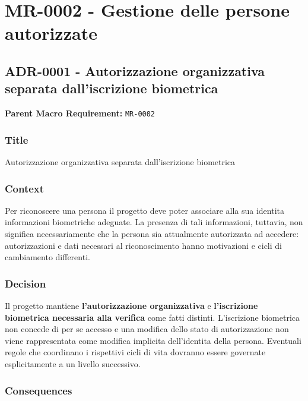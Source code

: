\documentclass[
  10pt,
]{article}
\begin{document}
\section{MR-0002 - Gestione delle persone
autorizzate}\label{mr-0002---gestione-delle-persone-autorizzate}

\subsection{ADR-0001 - Autorizzazione organizzativa separata
dall'iscrizione
biometrica}\label{adr-0001---autorizzazione-organizzativa-separata-dalliscrizione-biometrica}

\textbf{Parent Macro Requirement:} \texttt{MR-0002}

\subsubsection{Title}\label{title-2}

Autorizzazione organizzativa separata dall'iscrizione biometrica

\subsubsection{Context}\label{context-2}

Per riconoscere una persona il progetto deve poter associare alla sua
identita informazioni biometriche adeguate. La presenza di tali
informazioni, tuttavia, non significa necessariamente che la persona sia
attualmente autorizzata ad accedere: autorizzazioni e dati necessari al
riconoscimento hanno motivazioni e cicli di cambiamento differenti.

\subsubsection{Decision}\label{decision-2}

Il progetto mantiene \textbf{l'autorizzazione organizzativa} e
\textbf{l'iscrizione biometrica necessaria alla verifica} come fatti
distinti. L'iscrizione biometrica non concede di per se accesso e una
modifica dello stato di autorizzazione non viene rappresentata come
modifica implicita dell'identita della persona. Eventuali regole che
coordinano i rispettivi cicli di vita dovranno essere governate
esplicitamente a un livello successivo.

\subsubsection{Consequences}\label{consequences-2}
\end{document}
